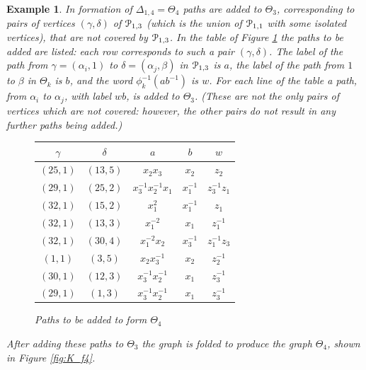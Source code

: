 \documentclass[a4paper,12pt]{article}
\renewcommand{\a}{\alpha }
\renewcommand{\b}{\beta }
\newcommand{\g}{\gamma }
\newcommand{\D}{\Delta }
\renewcommand{\d}{\delta }
\newcommand{\T}{\Theta }
\newcommand{\cP}{{\cal{P}}}
\newtheorem{exam}[theorem]{Example}
\newenvironment{example}{\begin{exam} \rm}{\end{exam}}
\numberwithin{equation}{section}
\numberwithin{figure}{section}
\begin{document}
\begin{example}
In formation of $\D_{1,4}=\T_4$ paths are added to $\T_3$,
corresponding to pairs of vertices $(\g,\d)$ of $\cP_{1,3}$ (which 
is the union of $\cP_{1,1}$ with some isolated vertices), that 
are not covered by $\cP_{1,3}$.
In the table of Figure \ref{tab:T4} the paths to be added are listed:
each row corresponds to such a pair $(\g,\d)$. The
label of the path from $\g=(\a_i,1)$ to $\d=(\a_j,\b)$
in $\cP_{1,3}$ is $a$,
the label of the path from $1$ to $\b$ in $\T_k$ is $b$, and the word
$\phi_k^{-1}(ab^{-1})$ is $w$. For each line of the table a path,
from $\a_i$ to $\a_j$, with label $wb$, is added to $\T_3$.
(These are not the only pairs of vertices which are not
covered: however, the other pairs do not result in any further paths
being added.)
\begin{figure}
\begin{center}
\renewcommand{\arraystretch}{1.5}
\begin{tabular}{|c|c|c|c|c|}
\hline
$\g$& $\d$ & $a$ & $b$ & $w$\\\hline\hline
$(25,1)$ & $(13,5)$ & $x_2x_3$ & $x_2$ & $z_2 $\\\hline
$(29,1)$ & $(25,2)$ & $x_3^{-1}x_2^{-1}x_1$ & $x_1^{-1}$ & $z_3^{-1}z_1$\\\hline
$(32,1)$ & $(15,2)$ & $x_1^2$ & $ x_1^{-1}$ & $z_1$\\\hline
$(32,1)$ & $(13,3)$ & $x_1^{-2} $ & $x_1 $ & $z_1^{-1} $\\\hline
$(32,1)$ & $(30,4)$ & $x_1^{-2}x_2$ & $x_3^{-1} $ & $z_1^{-1}z_3$\\\hline
$(1,1)$ & $(3,5)$ & $x_2x_3^{-1} $ & $x_2 $ & $z_2^{-1} $\\\hline
$(30,1)$ & $(12,3)$ & $x_3^{-1}x_2^{-1}$ & $x_1 $ & $z_3^{-1} $\\\hline
$(29,1)$ & $(1,3)$ & $x_3^{-1}x_2^{-1}$ & $x_1 $ & $z_3^{-1} $\\\hline
\end{tabular}
\renewcommand{\arraystretch}{1}
\end{center}
\caption{Paths to be added to form $\T_4$}
\label{tab:T4}
\end{figure}
After adding these paths to $\T_3$ the graph is folded to
produce the graph $\T_4$, shown in Figure \ref{fig:K_f4}.


\end{example}
\end{document}
